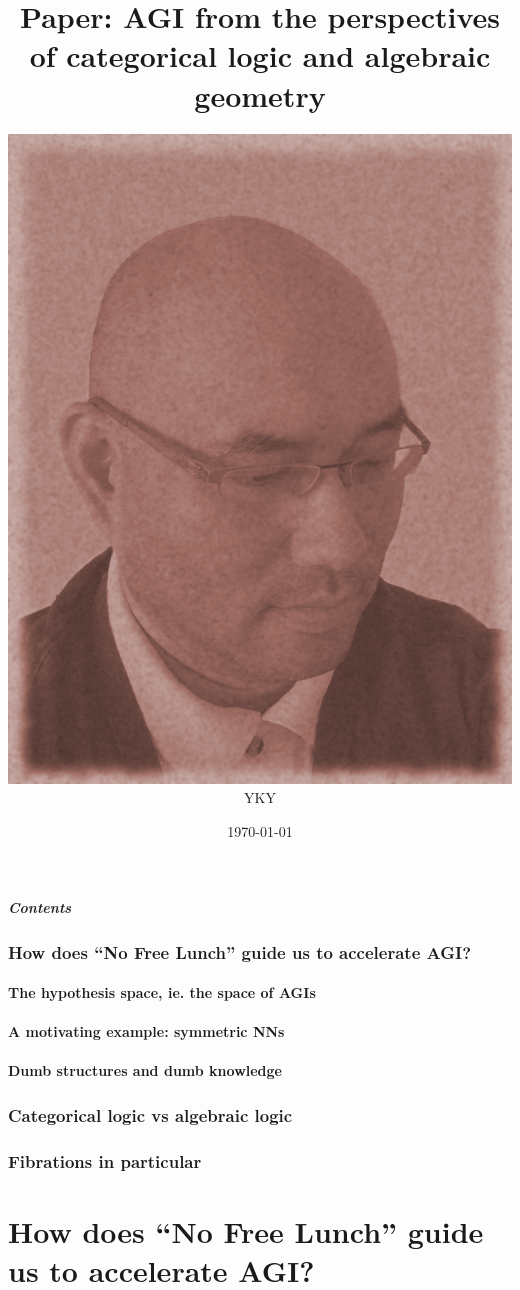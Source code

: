 \documentclass[16pt]{beamer}
\title[AGI and categorical logic]{{Paper: AGI from the perspectives of categorical logic and algebraic geometry}}
\author{\includegraphics[scale=0.14]{John_Grothendieck.png} \\ \centering YKY}
\date{\today} %
\newcommand{\smiley}{$\vcenter{\hbox{\texttt{[image: ../../smiling-face.png]}}}$}
\begin{document}
\addtocounter{page}{-1}
\begin{frame}
\titlepage
\end{frame}

\addtocounter{page}{-1}
\begin{frame}[noframenumbering]
\frametitle{Contents}
\tableofcontents
\end{frame}


\section{How does ``No Free Lunch'' guide us to accelerate AGI?}
\subsection{The hypothesis space, ie. the space of AGIs}
\subsection{A motivating example: symmetric NNs}
\subsection{Dumb structures and dumb knowledge}
\section{Categorical logic vs algebraic logic}
\section{Fibrations in particular}

\part{How does ``No Free Lunch'' guide us to accelerate AGI?}
\frame{\partpage}
\end{document}
